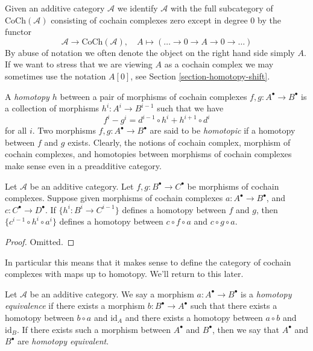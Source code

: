 \medskip\noindent
Given an additive category $\mathcal{A}$ we identify $\mathcal{A}$
with the full subcategory of $\text{CoCh}(\mathcal{A})$ consisting
of cochain complexes zero except in degree $0$ by the functor
$$
\mathcal{A} \longrightarrow \text{CoCh}(\mathcal{A}),\quad
A \longmapsto (\ldots \to 0 \to A \to 0 \to \ldots)
$$
By abuse of notation we often denote the object on the right hand side
simply $A$. If we want to stress that we are viewing $A$ as a cochain
complex we may sometimes use the notation $A[0]$, see
Section \ref{section-homotopy-shift}.

\medskip\noindent
A {\it homotopy $h$} between a pair of morphisms
of cochain complexes $f, g : A^\bullet \to B^\bullet$
is a collection of morphisms $h^i : A^i \to B^{i - 1}$
such that we have
$$
f^i - g^i = d^{i - 1} \circ h^i + h^{i + 1} \circ d^i
$$
for all $i$.
Two morphisms $f, g : A^\bullet \to B^\bullet$ are
said to be {\it homotopic} if a homotopy between $f$
and $g$ exists.
Clearly, the notions of cochain complex, morphism of
cochain complexes, and homotopies between morphisms of cochain complexes
make sense even in a preadditive category.

\begin{lemma}
\label{lemma-compose-homotopy-cochain}
Let $\mathcal{A}$ be an additive category.
Let $f, g : B^\bullet \to C^\bullet$ be morphisms
of cochain complexes. Suppose given morphisms of cochain
complexes $a : A^\bullet \to B^\bullet$, and
$c : C^\bullet \to D^\bullet$.
If $\{h^i : B^i \to C^{i - 1}\}$ defines a homotopy
between $f$ and $g$, then $\{c^{i - 1} \circ h^i \circ a^i\}$
defines a homotopy between $c \circ f \circ a$ and
$c \circ g \circ a$.
\end{lemma}

\begin{proof}
Omitted.
\end{proof}

\noindent
In particular this means that it makes sense to define
the category of cochain complexes with maps up to homotopy.
We'll return to this later.

\begin{definition}
\label{definition-homotopy-equivalent-cochain}
Let $\mathcal{A}$ be an additive category.
We say a morphism $a : A^\bullet \to B^\bullet$
is a {\it homotopy equivalence} if there exists
a morphism $b : B^\bullet \to A^\bullet$
such that there exists a homotopy between
$b \circ a$ and $\text{id}_A$
and there exists a homotopy between $a \circ b$ and $\text{id}_B$.
If there exists such a morphism between $A^\bullet$ and $B^\bullet$, then
we say that $A^\bullet$ and $B^\bullet$ are {\it homotopy equivalent}.
\end{definition}

